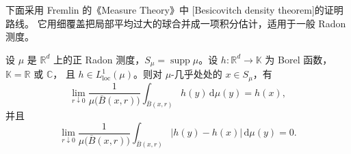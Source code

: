 下面采用 Fremlin 的《Measure Theory》\cite[472D]{Fremlin2016Measure}中
[Besicovitch density theorem]的证明路线。
它用细覆盖把局部平均过大的球合并成一项积分估计，适用于一般 Radon 测度。

\begin{theorem}[Besicovitch 密度]\label{b1:thm:radon-function-differentiation}
设 \(\mu\) 是 \(\mathbb R^d\) 上的正 Radon 测度，\(S_\mu=\operatorname{supp}\mu\)。设 \(h\colon\mathbb R^d\to\mathbb K\) 为 Borel 函数，\(\mathbb K=\mathbb R\) 或 \(\mathbb C\)，
且 \(h\in L^1_{\mathrm{loc}}(\mu)\)。则对 \(\mu\)-几乎处处的 \(x\in S_\mu\)，有
\begin{equation}\label{b1:eq:radon-function-average}
 \lim_{r\downarrow0}
 \frac1{\mu\bigl(\overline B(x,r)\bigr)}
 \int_{\overline B(x,r)}h(y)\,\mathrm d\mu(y)=h(x),
\end{equation}
并且
\begin{equation}\label{b1:eq:radon-function-oscillation}
 \lim_{r\downarrow0}
 \frac1{\mu\bigl(\overline B(x,r)\bigr)}
 \int_{\overline B(x,r)}|h(y)-h(x)|\,\mathrm d\mu(y)=0.
\end{equation}
\end{theorem}

